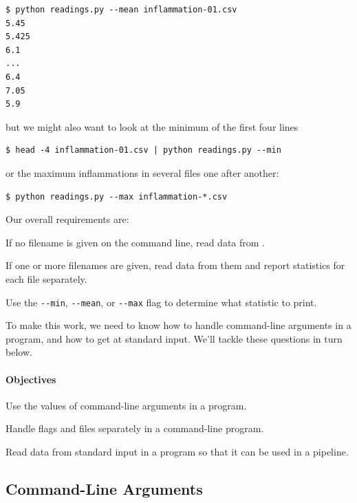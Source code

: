 \documentclass{book}
\begin{document}
\begin{verbatim}
$ python readings.py --mean inflammation-01.csv
5.45
5.425
6.1
...
6.4
7.05
5.9
\end{verbatim}

but we might also want to look at the minimum of the first four lines

\begin{verbatim}
$ head -4 inflammation-01.csv | python readings.py --min
\end{verbatim}

or the maximum inflammations in several files one after another:

\begin{verbatim}
$ python readings.py --max inflammation-*.csv
\end{verbatim}

Our overall requirements are:

\begin{swcenumerate}
\item
  If no filename is given on the command line, read data from
  .
\item
  If one or more filenames are given, read data from them and report
  statistics for each file separately.
\item
  Use the \texttt{-{}-min}, \texttt{-{}-mean}, or \texttt{-{}-max} flag
  to determine what statistic to print.
\end{swcenumerate}

To make this work, we need to know how to handle command-line arguments
in a program, and how to get at standard input. We'll tackle these
questions in turn below.

\mbox{}\paragraph{Objectives}

\begin{swcitemize}
\item
  Use the values of command-line arguments in a program.
\item
  Handle flags and files separately in a command-line program.
\item
  Read data from standard input in a program so that it can be used in a
  pipeline.
\end{swcitemize}

\subsection{Command-Line Arguments}
\end{document}

